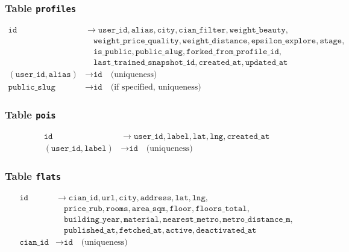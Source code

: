 \documentclass[12pt,a4paper]{article}
\begin{document}
\subsubsection{Table \texttt{profiles}}
\begin{align}
    \texttt{id} &\rightarrow \texttt{user\_id}, \texttt{alias}, \texttt{city}, \texttt{cian\_filter}, \texttt{weight\_beauty}, \\
    &\quad \texttt{weight\_price\_quality}, \texttt{weight\_distance}, \texttt{epsilon\_explore}, \texttt{stage}, \\
    &\quad \texttt{is\_public}, \texttt{public\_slug}, \texttt{forked\_from\_profile\_id}, \\
    &\quad \texttt{last\_trained\_snapshot\_id}, \texttt{created\_at}, \texttt{updated\_at} \\
    (\texttt{user\_id}, \texttt{alias}) &\rightarrow \texttt{id} \quad \text{(uniqueness)} \\
    \texttt{public\_slug} &\rightarrow \texttt{id} \quad \text{(if specified, uniqueness)}
\end{align}

\subsubsection{Table \texttt{pois}}
\begin{align}
    \texttt{id} &\rightarrow \texttt{user\_id}, \texttt{label}, \texttt{lat}, \texttt{lng}, \texttt{created\_at} \\
    (\texttt{user\_id}, \texttt{label}) &\rightarrow \texttt{id} \quad \text{(uniqueness)}
\end{align}

\subsubsection{Table \texttt{flats}}
\begin{align}
    \texttt{id} &\rightarrow \texttt{cian\_id}, \texttt{url}, \texttt{city}, \texttt{address}, \texttt{lat}, \texttt{lng}, \\
    &\quad \texttt{price\_rub}, \texttt{rooms}, \texttt{area\_sqm}, \texttt{floor}, \texttt{floors\_total}, \\
    &\quad \texttt{building\_year}, \texttt{material}, \texttt{nearest\_metro}, \texttt{metro\_distance\_m}, \\
    &\quad \texttt{published\_at}, \texttt{fetched\_at}, \texttt{active}, \texttt{deactivated\_at} \\
    \texttt{cian\_id} &\rightarrow \texttt{id} \quad \text{(uniqueness)}
\end{align}
\end{document}
